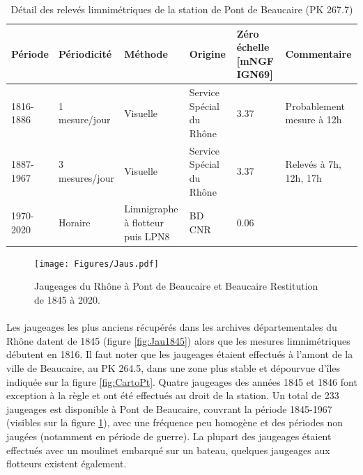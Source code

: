 \documentclass[11pt]{article}
\begin{document}
    
	\begin{table}[h]
	\centering
	\caption{Détail des relevés limnimétriques de la station de Pont de Beaucaire (PK 267.7)}
    \label{tab:MesuresPtBcr}
       \begin{tabular}{| m{2cm} | m{2.6cm}| m{2.2cm} | m{3cm} | m{2.7cm} | m{2.5cm} |} 
                \hline
               Période & Périodicité & Méthode & Origine & Zéro échelle [mNGF IGN69] & Commentaire \\
                \hline
                1816-1886 & 1 mesure/jour & Visuelle & 
                Service Spécial du Rhône & 3.37 & Probablement mesure à 12h \\
                \hline
                1887-1967 & 3 mesures/jour & Visuelle & 
                Service Spécial du Rhône & 3.37 & Relevés à 7h, 12h, 17h\\
                \hline
               1970-2020 & Horaire & Limnigraphe à flotteur puis LPN8 & 
                BD CNR & 0.06 &  \\
                \hline
		\end{tabular}
       \end{table}       
       
        
    \begin{figure}[h]
	\centering
		\texttt{[image: Figures/Jaus.pdf]}
        \caption{Jaugeages du Rhône à Pont de Beaucaire et Beaucaire Restitution de 1845 à 2020.}	
		\label{fig:JauAll}
	\end{figure}
       
    \paragraph{} Les jaugeages les plus anciens récupérés dans les archives départementales du Rhône datent de 1845 (figure \ref{fig:Jau1845}) alors que les mesures limnimétriques débutent en 1816. Il faut noter que les jaugeages étaient effectués à l'amont de la ville de Beaucaire, au PK 264.5, dans une zone plus stable et dépourvue d'îles indiquée sur la figure \ref{fig:CartoPt}. Quatre jaugeages des années 1845 et 1846 font exception à la règle et ont été effectués au droit de la station. Un total de 233 jaugeages est disponible à Pont de Beaucaire, couvrant la période 1845-1967 (visibles sur la figure \ref{fig:JauAll}), avec une fréquence peu homogène et des périodes non jaugées (notamment en période de guerre). La plupart des jaugeages étaient effectués avec un moulinet embarqué sur un bateau, quelques jaugeages aux flotteurs existent également. 
    
\end{document}
